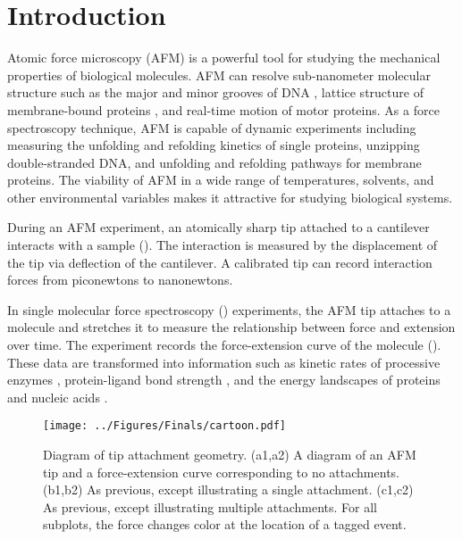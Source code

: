 \section{Introduction}

\firstp Atomic force microscopy (AFM) is a powerful tool for studying the mechanical properties of biological molecules.  AFM can resolve sub-nanometer molecular structure such as the major and minor grooves of DNA , lattice structure of membrane-bound proteins , and real-time motion of motor proteins. As a force spectroscopy technique, AFM is capable of dynamic experiments including measuring the unfolding and refolding kinetics of single proteins, unzipping double-stranded DNA, and unfolding and refolding pathways for membrane proteins. The viability of AFM in a wide range of temperatures, solvents, and other environmental variables makes it attractive for studying biological systems. \pl

During an AFM experiment, an atomically sharp tip attached to a cantilever interacts with a sample (). The interaction is measured by the displacement of the tip via deflection of the cantilever. A calibrated tip can record interaction forces from piconewtons to nanonewtons. \pl

In single molecular force spectroscopy (\singlemol{}) experiments, the AFM tip attaches to a molecule and stretches it to measure the relationship between force and extension over time. The experiment records the force-extension curve of the molecule (). These data are transformed into information such as kinetic rates of processive enzymes , protein-ligand bond strength , and the energy landscapes of proteins and nucleic acids . \pl

\begin{figure}
\centering
\texttt{[image: ../Figures/Finals/cartoon.pdf]}%
\caption[Diagram of AFM attachment geometry]{\pStartF Diagram of tip attachment geometry. (a1,a2) A diagram of an AFM tip and a force-extension curve corresponding to no attachments. (b1,b2) As previous, except illustrating a single attachment. (c1,c2) As previous, except illustrating multiple attachments. For all subplots, the force changes color at the location of a tagged event.  \pEndF }
\end{figure}


